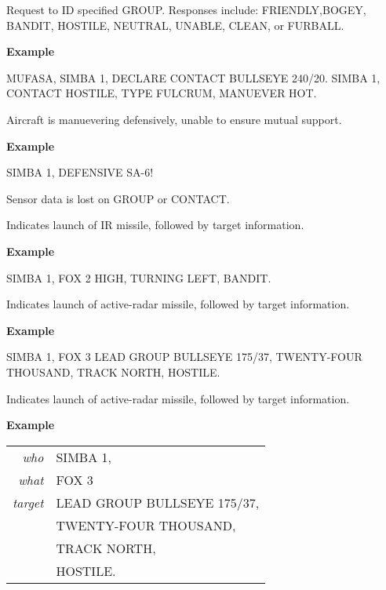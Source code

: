 \begin{tcoloritemize}
    \blueitem[DECLARE] 
    Request to ID specified GROUP. Responses include: 
    FRIENDLY,BOGEY, BANDIT, HOSTILE, NEUTRAL,
    UNABLE, CLEAN, or FURBALL. 

    \medskip
    \textbf{Example}
    \begin{center}
        \begin{minipage}{0.9\textwidth}
            MUFASA, SIMBA 1, DECLARE CONTACT BULLSEYE 240/20.
            SIMBA 1, CONTACT HOSTILE, TYPE FULCRUM, MANUEVER HOT.
        \end{minipage}
    \end{center}

    \blueitem[DEFENSIVE] 
    Aircraft is manuevering defensively, unable to ensure mutual support. 

    \medskip
    \textbf{Example}
    \begin{center}
        \begin{minipage}{0.9\textwidth}
            SIMBA 1, DEFENSIVE SA-6!
        \end{minipage}
    \end{center}

    \blueitem[FADED] 
    Sensor data is lost on GROUP or CONTACT.

    \blueitem[FOX 2]
    Indicates launch of IR missile,
    followed by target information.

    \medskip
    \textbf{Example}
    \begin{center}
        \begin{minipage}{0.9\textwidth}
            SIMBA 1, FOX 2 HIGH, TURNING LEFT, BANDIT.
        \end{minipage}
    \end{center}

    \blueitem[FOX 3]
    Indicates launch of active-radar missile,
    followed by target information.

    \medskip
    \textbf{Example}
    \begin{center}
        \begin{minipage}{0.9\textwidth}
            SIMBA 1, FOX 3 LEAD GROUP BULLSEYE 175/37, 
            TWENTY-FOUR THOUSAND,
            TRACK NORTH, 
            HOSTILE.
        \end{minipage}
    \end{center}

    \blueitem[FOX 3]
    Indicates launch of active-radar missile,
    followed by target information.

    \medskip
    \textbf{Example}
    \begin{center}
        \begin{tabular}{>{\itshape}r l}
            who & SIMBA 1, \\
            what & FOX 3 \\
            target & LEAD GROUP BULLSEYE 175/37, \\
            & TWENTY-FOUR THOUSAND, \\
            & TRACK NORTH, \\
            & HOSTILE. \\
        \end{tabular}
    \end{center}


\end{tcoloritemize}
